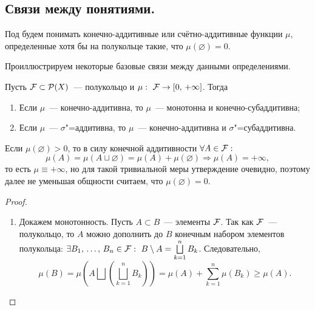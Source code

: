 \newpage
{}

\subsection{Связи между понятиями.}

\begin{definition}
    Под  будем понимать конечно-аддитивные или счётно-аддитивные функции $\mu$, определенные хотя бы на
    полукольце такие, что $\mu(\varnothing)=0$.
\end{definition}

Проиллюстрируем некоторые базовые связи между данными определениями.

\begin{claim}
    \label{lect5:cl1}
    Пусть $\mathcal{F} \subset\mathcal{P}(X)$~--- полукольцо и $\mu:\ \mathcal{F} \rightarrow[0,\,+\infty]$. Тогда
    \begin{enumerate}
        \item Если $\mu$~--- конечно-аддитивна, то $\mu$~--- монотонна и конечно-субаддитивна;
        \item Если $\mu$~--- $\sigma$"=аддитивна, то $\mu$~--- конечно-аддитивна и $\sigma$"=субаддитивна.
    \end{enumerate}

    \begin{remark}
        Если $\mu(\varnothing)>0$, то в силу конечной аддитивности $\forall A\in\mathcal{F} :$
        \[\mu(A)=\mu(A\sqcup \varnothing)=\mu(A)+\mu(\varnothing)\Rightarrow\mu(A)=+\infty,\]
        то есть $\mu\equiv +\infty$, но для такой тривиальной меры утверждение очевидно, поэтому далее не уменьшая общности
        считаем, что $\mu(\varnothing)=0$.
    \end{remark}

    \begin{proof}
        \begin{enumerate}
            \item Докажем монотонность. Пусть $A\subset B$~--- элементы $\mathcal{F} $. Так как $\mathcal{F} $~--- полукольцо, то $A$ можно дополнить до $B$ конечным набором элементов
                  полукольца: $\exists B_1,\,\ldots,\, B_n\in\mathcal{F} :\ B\setminus A = \bigsqcup\limits_{k=1}^n B_k$. Следовательно,
                  \[
                      \mu(B)=\mu\left(A\bigsqcup\left(\bigsqcup_{k=1}^n B_k\right)\right)=
                      \mu(A)+\sum_{k=1}^n\mu(B_k)\geqslant \mu(A).
                  \]


\end{enumerate}
\end{proof}
\end{claim}
